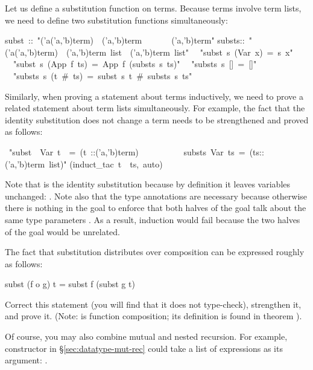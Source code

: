 \begin{isabelle}
\begin{isamarkuptext}
Let us define a substitution function on terms. Because terms involve term
lists, we need to define two substitution functions simultaneously:%
\end{isamarkuptext}%
\isanewline
subst~::~{"}('a{\isasymRightarrow}('a,'b)term)~{\isasymRightarrow}~('a,'b)term~~~~~~{\isasymRightarrow}~('a,'b)term{"}\isanewline
substs::~{"}('a{\isasymRightarrow}('a,'b)term)~{\isasymRightarrow}~('a,'b)term~list~{\isasymRightarrow}~('a,'b)term~list{"}\isanewline
\isanewline
{}\isanewline
~~{"}subst~s~(Var~x)~=~s~x{"}\isanewline
~~{"}subst~s~(App~f~ts)~=~App~f~(substs~s~ts){"}\isanewline
\isanewline
~~{"}substs~s~[]~=~[]{"}\isanewline
~~{"}substs~s~(t~\#~ts)~=~subst~s~t~\#~substs~s~ts{"}%
\begin{isamarkuptext}%
\noindent
Similarly, when proving a statement about terms inductively, we need
to prove a related statement about term lists simultaneously. For example,
the fact that the identity substitution does not change a term needs to be
strengthened and proved as follows:%
\end{isamarkuptext}%
~{"}subst~~Var~t~~=~(t~::('a,'b)term)~~{\isasymand}\isanewline
~~~~~~~~substs~Var~ts~=~(ts::('a,'b)term~list){"}\isanewline
{}(induct\_tac~t~~ts,~auto)%
\begin{isamarkuptext}%
\noindent
Note that  is the identity substitution because by definition it
leaves variables unchanged: . Note also
that the type annotations are necessary because otherwise there is nothing in
the goal to enforce that both halves of the goal talk about the same type
parameters . As a result, induction would fail
because the two halves of the goal would be unrelated.

\begin{exercise}
The fact that substitution distributes over composition can be expressed
roughly as follows:
\begin{ttbox}
subst (f o g) t = subst f (subst g t)
\end{ttbox}
Correct this statement (you will find that it does not type-check),
strengthen it, and prove it. (Note:  is function composition;
its definition is found in theorem ).
\end{exercise}

Of course, you may also combine mutual and nested recursion. For example,
constructor  in \S\ref{sec:datatype-mut-rec} could take a list of
expressions as its argument: .%
\end{isamarkuptext}%
\end{isabelle}%
